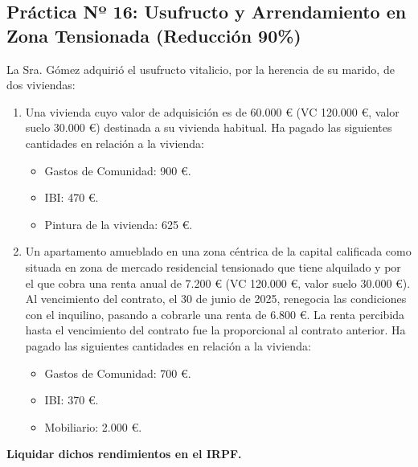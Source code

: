 \documentclass[11pt,a4paper,openany]{article}
\begin{document}
\vspace{0.4cm}

\subsection{Práctica Nº 16: Usufructo y Arrendamiento en Zona Tensionada (Reducción 90\%)}

\begin{enunciadoBox}
La Sra. Gómez adquirió el usufructo vitalicio, por la herencia de su marido, de dos viviendas:
\begin{enumerate}[label=\textbf{\alph*)}]
    \item Una vivienda cuyo valor de adquisición es de 60.000 \euro{} (VC 120.000 \euro{}, valor suelo 30.000 \euro{}) destinada a su vivienda habitual. Ha pagado las siguientes cantidades en relación a la vivienda:
    \begin{itemize}
        \item Gastos de Comunidad: 900 \euro{}.
        \item IBI: 470 \euro{}.
        \item Pintura de la vivienda: 625 \euro{}.
    \end{itemize}
    \item Un apartamento amueblado en una zona céntrica de la capital calificada como situada en zona de mercado residencial tensionado que tiene alquilado y por el que cobra una renta anual de 7.200 \euro{} (VC 120.000 \euro{}, valor suelo 30.000 \euro{}). Al vencimiento del contrato, el 30 de junio de 2025, renegocia las condiciones con el inquilino, pasando a cobrarle una renta de 6.800 \euro{}. La renta percibida hasta el vencimiento del contrato fue la proporcional al contrato anterior. Ha pagado las siguientes cantidades en relación a la vivienda:
    \begin{itemize}
        \item Gastos de Comunidad: 700 \euro{}.
        \item IBI: 370 \euro{}.
        \item Mobiliario: 2.000 \euro{}.
    \end{itemize}
\end{enumerate}
\textbf{Liquidar dichos rendimientos en el IRPF.}
\end{enunciadoBox}
\end{document}

